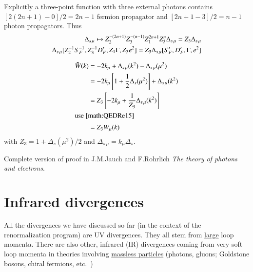 Explicitly a three-point function with three external photons contains $[2(2n+1)-0]/2 = 2n+1$ fermion propagator and $[2n+1-3]/2=n-1$ photon propagators. Thus
\begin{align}
   \Delta_{s\,\mu} \mapsto Z_2^{-(2n+1)} Z_3^{-(n-1)} Z_1^{2n+1} Z_3^{n} \Delta_{s\,\mu} = Z_3 \Delta_{s\,\mu} \notag \\
   \Delta_{s\,\mu}[Z_2^{-1}S_F^{-1}, Z_3^{-1}D'_F, Z_1 \Gamma, Z_3 e^2] = Z_3 \Delta_{s\, \mu} [S'_F, D'_F, \Gamma, e^2] \label{math:QEDRe15}
\end{align}

\begin{align*}
   \tilde{W}(k) &= -2 k_\mu + \Delta_{s\,\mu}(k^2) - \Delta_{s\,\mu} (\mu^2) \\
                &= -2 k_\mu \left[ 1 + \frac{1}{2} \Delta_s (\mu^2) \right] + \Delta_{s\,\mu}(k^2) \\
                &= Z_3 \left[ -2 k_\mu + \frac{1}{Z_3} \Delta_{s\,\mu}(k^2)  \right] \\
   \shortintertext{use \ref{math:QEDRe15}}
                &= Z_3 W_\mu(k)
\end{align*}
with $Z_3 = 1 + \Delta_s(\mu^2)/2$ and $\Delta_{s\,\mu} = k_\mu \Delta_s $.

Complete version of proof in J.M.Jauch and F.Rohrlich \textit{The theory of photons and electrons}.

\section{Infrared divergences}
All the divergences we have discussed so far (in the context of the renormalization program) are UV divergences. They all stem from \underline{large} loop momenta. There are also other, infrared (IR) divergences coming from very soft loop momenta in theories involving \underline{massless particles} (photons, gluons; Goldstone bosons, chiral fermions, etc.~)

